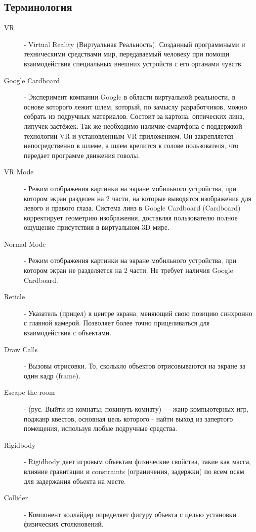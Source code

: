\subsection{Терминология}
\begin{description}


\item[VR] - 
Virtual Reality (Виртуальная Реальность). Созданный программными и техническими 
средствами мир, передаваемый человеку при помощи взаимодействия специальных 
внешних устройств с его органами чувств. 

\item[Google Cardboard] - 
Эксперимент компании Google в области виртуальной реальности, в основе которого 
лежит шлем, который, по замыслу разработчиков, можно собрать из подручных 
материалов. Состоит за картона, оптических линз, липучек-застёжек. Так же 
необходимо наличие смартфона с поддержкой технологии VR и установленным VR 
приложением. Он закрепляется непосредственно в шлеме, а шлем крепится к голове 
пользователя, что передает программе движения говолы. 

\item[VR Mode] - 
Режим отображения картинки на экране мобильного устройства, при котором экран 
разделен на 2 части, на которые выводятся изображения для левого и правого 
глаза. Система линз в Google Cardboard (Cardboard) корректирует геометрию 
изображения, доставляя пользователю полное ощущение присутствия в виртуальном 
3D мире.

\item[Normal Mode] - 
Режим отображения картинки на экране мобильного устройства, при котором экран 
не разделяется на 2 части. Не требует наличия Google Cardboard. 

\item[Reticle] - 
Указатель (прицел) в центре экрана, меняющий свою позицию синхронно с главной 
камерой. Позволяет более точно прицеливаться для взаимодействия с объектами.

\item[Draw Calls] - 
Вызовы отрисовки. То, сколькло объектов отрисовываются на экране за один кадр 
(frame). 

\item[Escape the room] - 
(рус. Выйти из комнаты; покинуть комнату) — жанр компьютерных игр, поджанр 
квестов, основная цель которого - найти выход из запертого помещения, используя 
любые подручные средства. 

\item[Rigidbody] - 
Rigidbody дает игровым объектам физические свойства, такие как масса, влияние гравитации и constraints (ограничения, задержки) по всем осям для задержания объекта на месте.

\item[Collider] - 
Компонент коллайдер определяет фигуру объекта с целью установки физических столкновений.
\end{description}

